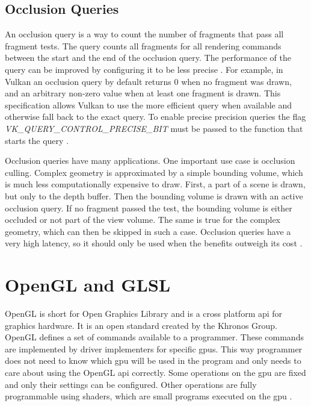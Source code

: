 \subsection{Occlusion Queries}
An occlusion query is a way to count the number of fragments that pass all fragment tests. The query counts all fragments for all rendering commands between the start and the end of the occlusion query. The performance of the query can be improved by configuring it to be less precise \cite{akine:2018:realtime}. For example, in Vulkan an occlusion query by default returns 0 when no fragment was drawn, and an arbitrary non-zero value when at least one fragment is drawn. This specification allows Vulkan to use the more efficient query when available and otherwise fall back to the exact query. To enable precise precision queries the flag \textit{VK\_QUERY\_CONTROL\_PRECISE\_BIT} must be passed to the function that starts the query \cite{khronos:vulkan:spec1.1}.

Occlusion queries have many applications. One important use case is occlusion culling. Complex geometry is approximated by a simple bounding volume, which is much less computationally expensive to draw. First, a part of a scene is drawn, but only to the depth buffer. Then the bounding volume is drawn with an active occlusion query. If no fragment passed the test, the bounding volume is either occluded or not part of the view volume. The same is true for the complex geometry, which can then be skipped in such a case. Occlusion queries have a very high latency, so it should only be used when the benefits outweigh its cost   \cite{akine:2018:realtime, sellers:vulkanprogramming}.

\section{OpenGL and GLSL}
OpenGL is short for Open Graphics Library and is a cross platform \gls{api} for graphics hardware. It is an open standard created by the Khronos Group. OpenGL defines a set of commands available to a programmer. These commands are implemented by driver implementers for specific \glspl{gpu}. This way programmer does not need to know which \gls{gpu} will be used in the program and only needs to care about using the OpenGL \gls{api} correctly. Some operations on the \gls{gpu} are fixed and only their settings can be configured. Other operations are fully programmable using shaders, which are small programs executed on the \gls{gpu} \cite{khronos:glsl4.60:spec}.

